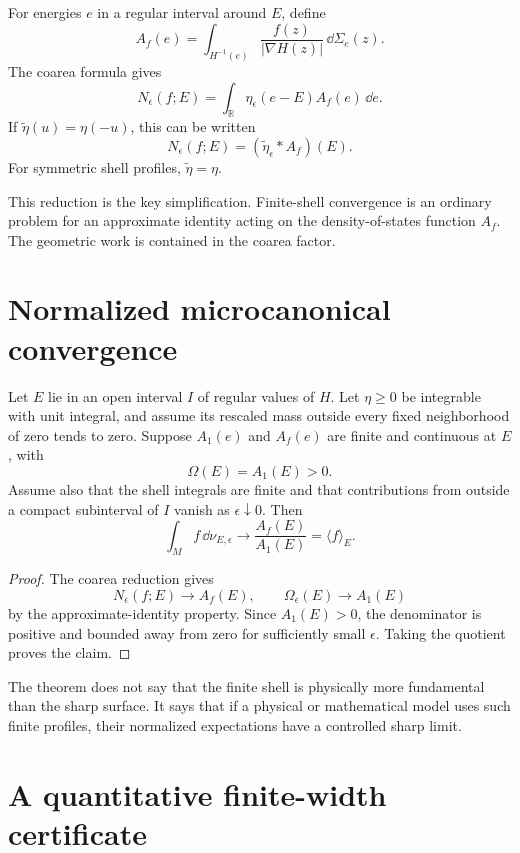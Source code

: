 \documentclass[11pt]{article}
\begin{document}
For energies \(e\) in a regular interval around \(E\), define
\[
A_f(e)
=
\int_{H^{-1}(e)}
\frac{f(z)}{|\nabla H(z)|}\,\dd\Sigma_e(z).
\]
The coarea formula gives
\[
N_\epsilon(f;E)
=
\int_{\mathbb R}
\eta_\epsilon(e-E)A_f(e)\,\dd e.
\]
If \(\widetilde\eta(u)=\eta(-u)\), this can be written
\[
N_\epsilon(f;E)
=
(\widetilde\eta_\epsilon*A_f)(E).
\]
For symmetric shell profiles, \(\widetilde\eta=\eta\).

This reduction is the key simplification. Finite-shell convergence is an
ordinary problem for an approximate identity acting on the density-of-states
function \(A_f\). The geometric work is contained in the coarea factor.

\section{Normalized microcanonical convergence}

\begin{theorem}
\label{thm:microcanonical-limit}
Let \(E\) lie in an open interval \(I\) of regular values of \(H\). Let
\(\eta\geq0\) be integrable with unit integral, and assume its rescaled mass
outside every fixed neighborhood of zero tends to zero. Suppose
\(A_1(e)\) and \(A_f(e)\) are finite and continuous at \(E\), with
\[
\Omega(E)=A_1(E)>0.
\]
Assume also that the shell integrals are finite and that contributions from
outside a compact subinterval of \(I\) vanish as \(\epsilon\downarrow0\).
Then
\[
\int_M f\,\dd\nu_{E,\epsilon}
\longrightarrow
\frac{A_f(E)}{A_1(E)}
=
\langle f\rangle_E.
\]
\end{theorem}

\begin{proof}
The coarea reduction gives
\[
N_\epsilon(f;E)\longrightarrow A_f(E),
\qquad
\Omega_\epsilon(E)\longrightarrow A_1(E)
\]
by the approximate-identity property. Since \(A_1(E)>0\), the denominator is
positive and bounded away from zero for sufficiently small \(\epsilon\).
Taking the quotient proves the claim.
\end{proof}

The theorem does not say that the finite shell is physically more fundamental
than the sharp surface. It says that if a physical or mathematical model uses
such finite profiles, their normalized expectations have a controlled sharp
limit.

\section{A quantitative finite-width certificate}
\end{document}
